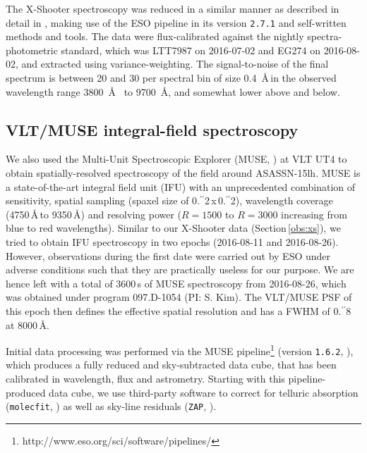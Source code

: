 \documentclass[traditabstract]{aa}
\newcommand{\farc}{\hbox{$.\!\!^{\prime\prime}$}}
\begin{document}
The X-Shooter spectroscopy was reduced in a similar manner as described in detail in \citet{2015A&A...581A.125K}, making use of the ESO pipeline in its version \texttt{2.7.1} \citep{2006SPIE.6269E..80G, 2010SPIE.7737E..56M} and self-written methods and tools. The data were flux-calibrated against the nightly spectra-photometric standard, which was LTT7987 on 2016-07-02 and EG274 on 2016-08-02, and extracted using variance-weighting. The signal-to-noise of the final spectrum is between 20 and 30 per spectral bin of size 0.4~\AA\,in the observed wavelength range 3800~\AA~ to 9700~\AA, and somewhat lower above and below.

\subsection{VLT/MUSE integral-field spectroscopy}
\label{obs:muse}

We also used the Multi-Unit Spectroscopic Explorer (MUSE, \citealt{2010SPIE.7735E..08B}) at VLT UT4 to obtain spatially-resolved spectroscopy of the field around ASASSN-15lh. MUSE is a state-of-the-art integral field unit (IFU) with an unprecedented combination of sensitivity, spatial sampling (spaxel size of 0\farc{2}\,x\,0\farc{2}), wavelength coverage (4750\,\AA\,to 9350\,\AA) and resolving power ($R=1500$ to $R=3000$ increasing from blue to red wavelengths). Similar to our X-Shooter data (Section\,\ref{obs:xs}), we tried to obtain IFU spectroscopy in two epochs (2016-08-11 and 2016-08-26). However, observations during the first date were carried out by ESO under adverse conditions such that they are practically useless for our purpose. We are hence left with a total of 3600\,s of MUSE spectroscopy from 2016-08-26, which was obtained under program 097.D-1054 (PI: S. Kim). The VLT/MUSE PSF of this epoch then defines the effective spatial resolution and has a FWHM of 0\farc{8} at 8000\,\AA.

Initial data processing was performed via the MUSE pipeline\footnote{http://www.eso.org/sci/software/pipelines/} (version \texttt{1.6.2}, \citealt{2014ASPC..485..451W}), which produces a fully reduced and sky-subtracted data cube, that has been calibrated in wavelength, flux and astrometry. Starting with this pipeline-produced data cube, we use third-party software to correct for telluric absorption (\texttt{molecfit}, \citet{2015A&A...576A..77S}) as well as sky-line residuals (\texttt{ZAP}, \citealt{2016MNRAS.458.3210S}).
\end{document}
